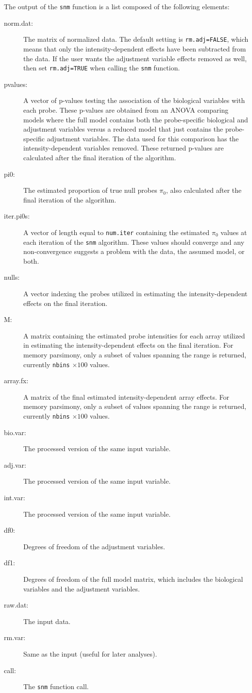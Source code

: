 \documentclass[11pt]{article}
\newcommand{\Rfunction}[1]{{\texttt{#1}}}
\begin{document}
The output of the \Rfunction{snm} function is a list composed of the following elements:
\begin{description}
\item[norm.dat:] The matrix of normalized data.  The default setting is {\tt rm.adj=FALSE}, which means that only the intensity-dependent effects have been subtracted from the data.  If the user wants the adjustment variable effects removed as well, then set {\tt rm.adj=TRUE} when calling the \Rfunction{snm} function.
\item[pvalues:] A vector of p-values testing the association of the biological variables with each probe.  These p-values are obtained
from an ANOVA comparing models where the full model contains both the probe-specific biological and adjustment variables versus a reduced
model that just contains the probe-specific adjustment variables.  The data used for this comparison has the intensity-dependent variables
removed.  These returned p-values are calculated after the final iteration of the algorithm.
\item[pi0:]  The estimated proportion of true null probes $\pi_0$, also calculated after the final iteration of the algorithm.
\item[iter.pi0s:] A vector of length equal to {\tt num.iter} containing the estimated $\pi_0$ values at each iteration of the \Rfunction{snm} algorithm.  These values should converge and any non-convergence suggests a problem with the data, the assumed model, or both.  
\item[nulls:]  A vector indexing the probes utilized in estimating the intensity-dependent effects on the final iteration.
\item[M:] A matrix containing the estimated probe intensities for each array utilized in estimating the intensity-dependent effects on the final iteration.  For memory parsimony, only a subset of values spanning the range is returned, currently {\tt nbins} $\times 100$ values.
\item[array.fx:] A matrix of the final estimated intensity-dependent array effects.  For memory parsimony, only a subset of values spanning the range is returned, currently {\tt nbins} $\times 100$ values.
\item[bio.var:] The processed version of the same input variable.  
\item[adj.var:] The processed version of the same input variable.  
\item[int.var:] The processed version of the same input variable.  
\item[df0:] Degrees of freedom of the adjustment variables.
\item[df1:] Degrees of freedom of the full model matrix, which includes the biological variables and the adjustment variables.
\item[raw.dat:] The input data.
\item[rm.var:] Same as the input (useful for later analyses).
\item[call:] The \Rfunction{snm} function call.
\end{description}
         
\end{document}
